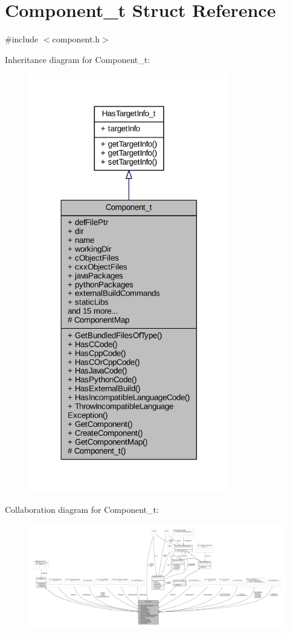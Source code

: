 \hypertarget{struct_component__t}{}\section{Component\+\_\+t Struct Reference}
\label{struct_component__t}


{\ttfamily \#include $<$component.\+h$>$}



Inheritance diagram for Component\+\_\+t\+:
\nopagebreak
\begin{figure}[H]
\begin{center}
\leavevmode
\includegraphics[width=248pt]{struct_component__t__inherit__graph}
\end{center}
\end{figure}


Collaboration diagram for Component\+\_\+t\+:
\nopagebreak
\begin{figure}[H]
\begin{center}
\leavevmode
\includegraphics[width=350pt]{struct_component__t__coll__graph}
\end{center}
\end{figure}
